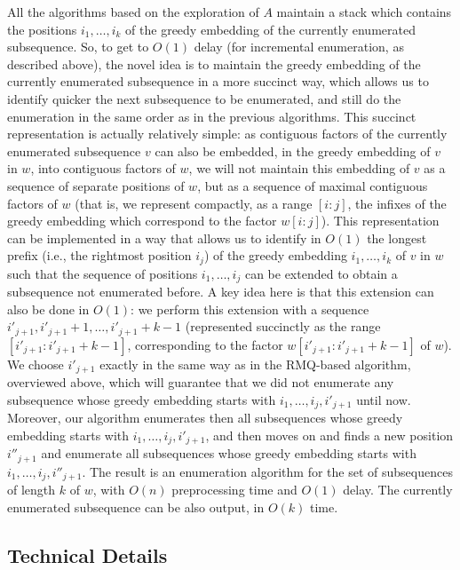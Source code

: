 \documentclass[runningheads,UKenglish,cleveref, autoref, thm-restate]{llncs}
\begin{document}
All the algorithms based on the exploration of $A$ maintain a stack which contains the positions $i_1,\ldots,i_k$ of the greedy embedding of the currently enumerated subsequence. So, to get to $O(1)$ delay (for incremental enumeration, as described above), the novel idea is to maintain the greedy embedding of the currently enumerated subsequence in a more succinct way, which allows us to identify quicker the next subsequence to be enumerated, and still do the enumeration in the same order as in the previous algorithms. This succinct representation is actually relatively simple: as contiguous factors of the currently enumerated subsequence $v$ can also be embedded, in the greedy embedding of $v$ in $w$, into contiguous factors of $w$, we will not maintain this embedding of $v$ as a sequence of separate positions of $w$, but as a sequence of maximal contiguous factors of $w$ (that is, we represent compactly, as a range $[i:j]$, the infixes of the greedy embedding which correspond to the factor $w[i:j]$). This representation can be implemented in a way that allows us to identify in $O(1)$ the longest prefix (i.e., the rightmost position $i_j$) of the greedy embedding $i_1,\ldots, i_k$ of $v$ in $w$ such that the sequence of positions $i_1,\ldots, i_j$ can be extended to obtain a subsequence not enumerated before. A key idea here is that this extension can also be done in $O(1)$: we perform this extension with a sequence $i'_{j+1},i'_{j+1}+1,\ldots, i'_{j+1}+k-1 $ (represented succinctly as the range $[i'_{j+1}:i'_{j+1}+k-1 ]$, corresponding to the factor $w[i'_{j+1}: i'_{j+1}+k-1]$ of $w$). We choose $i'_{j+1}$ exactly in the same way as in the RMQ-based algorithm, overviewed above, which will guarantee that we did not enumerate any subsequence whose greedy embedding starts with $i_1,\ldots, i_j, i'_{j+1}$ until now. Moreover, our algorithm enumerates then all subsequences whose greedy embedding starts with $i_1,\ldots, i_j, i'_{j+1}$, and then moves on and finds a new position $i''_{j+1}$ and enumerate all subsequences whose greedy embedding starts with $i_1,\ldots, i_j, i''_{j+1}$. 
The result is an enumeration algorithm for the set of subsequences of length $k$ of $w$, with $O(n)$ preprocessing time and $O(1)$ delay. The currently enumerated subsequence can be also output, in $O(k)$ time. 

\subsection{Technical Details}\label{sec:enum_tech_details}
\end{document}
